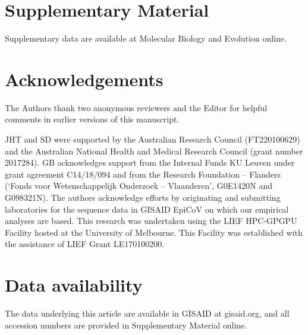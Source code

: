 \documentclass[11pt]{article}
\begin{document}
\section{Supplementary Material}
Supplementary data are available at Molecular Biology and Evolution online.

\section{Acknowledgements}
The Authors thank two anonymous reviewers and the Editor for helpful comments in earlier versions of this manuscript. 

JHT and SD were supported by the Australian Research Council (FT220100629) and the Australian National Health and Medical Research Council (grant number 2017284). GB acknowledges support from the Internal Funds KU Leuven under grant agreement C14/18/094 and from the Research Foundation -- Flanders (`Fonds voor Wetenschappelijk Onderzoek -- Vlaanderen', G0E1420N and G098321N).
The authors acknowledge efforts by originating and submitting laboratories for the sequence data in GISAID EpiCoV on which our empirical analyses are based. This research was undertaken using the LIEF HPC-GPGPU Facility hosted at the University of Melbourne. This Facility was established with the assistance of LIEF Grant LE170100200. 

\section{Data availability}
The data underlying this article are available in GISAID at gisaid.org, and all accession numbers are provided in Supplementary Material online.

%

\end{document}
